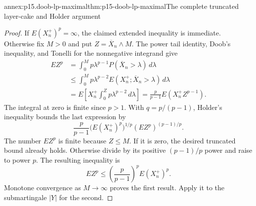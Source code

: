 \begin{annexitem}{annex:p15.doob-lp-maximal}{thm:p15-doob-lp-maximal}{The complete truncated layer-cake and Holder argument}
\begin{proof}
If \(E(X_n^+)^p=\infty\), the claimed extended inequality is immediate.
Otherwise fix \(M>0\) and put \(Z=\overline X_n\wedge M\).
The power tail identity, Doob's inequality, and Tonelli for the
nonnegative integrand give
\[
 \begin{aligned}
 EZ^p
   &=\int_0^M p\lambda^{p-1}P(\overline X_n>\lambda)\,d\lambda\\
   &\leq\int_0^M p\lambda^{p-2}
                          E(X_n^+;\overline X_n>\lambda)\,d\lambda\\
   &=E\left[X_n^+\int_0^Zp\lambda^{p-2}\,d\lambda\right]
     =\frac p{p-1}E(X_n^+Z^{p-1}).
 \end{aligned}
\]
The integral at zero is finite since \(p>1\).
With \(q=p/(p-1)\), Holder's inequality bounds the last expression by
\[
                    \frac p{p-1}
                         \bigl(E(X_n^+)^p\bigr)^{1/p}
                         (EZ^p)^{(p-1)/p}.
\]
The number \(EZ^p\) is finite because \(Z\leq M\).
If it is zero, the desired truncated bound already holds.
Otherwise divide by its positive \((p-1)/p\) power and raise
to power \(p\). The resulting inequality is
\[
                         EZ^p\leq
                              \left(\frac p{p-1}\right)^pE(X_n^+)^p.
\]
Monotone convergence as \(M\to\infty\) proves the first result.
Apply it to the submartingale \(|Y|\) for the second.
\end{proof}
\end{annexitem}

